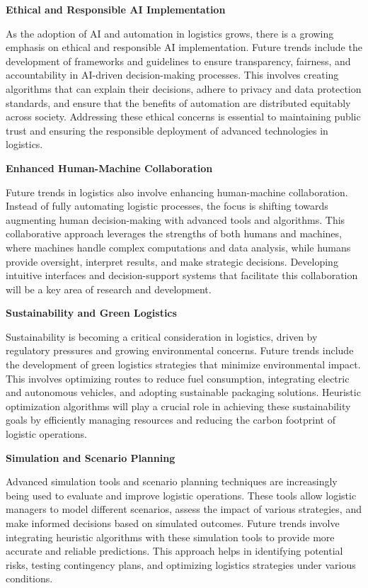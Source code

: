 \documentclass{article}
\begin{document}
    \textbf{Ethical and Responsible AI Implementation}

    As the adoption of AI and automation in logistics grows, there is a growing emphasis on ethical and responsible AI implementation. Future trends include the development of frameworks and guidelines to ensure transparency, fairness, and accountability in AI-driven decision-making processes. This involves creating algorithms that can explain their decisions, adhere to privacy and data protection standards, and ensure that the benefits of automation are distributed equitably across society. Addressing these ethical concerns is essential to maintaining public trust and ensuring the responsible deployment of advanced technologies in logistics.

    \textbf{Enhanced Human-Machine Collaboration}

    Future trends in logistics also involve enhancing human-machine collaboration. Instead of fully automating logistic processes, the focus is shifting towards augmenting human decision-making with advanced tools and algorithms. This collaborative approach leverages the strengths of both humans and machines, where machines handle complex computations and data analysis, while humans provide oversight, interpret results, and make strategic decisions. Developing intuitive interfaces and decision-support systems that facilitate this collaboration will be a key area of research and development.

    \textbf{Sustainability and Green Logistics}

    Sustainability is becoming a critical consideration in logistics, driven by regulatory pressures and growing environmental concerns. Future trends include the development of green logistics strategies that minimize environmental impact. This involves optimizing routes to reduce fuel consumption, integrating electric and autonomous vehicles, and adopting sustainable packaging solutions. Heuristic optimization algorithms will play a crucial role in achieving these sustainability goals by efficiently managing resources and reducing the carbon footprint of logistic operations.

    \textbf{Simulation and Scenario Planning}

    Advanced simulation tools and scenario planning techniques are increasingly being used to evaluate and improve logistic operations. These tools allow logistic managers to model different scenarios, assess the impact of various strategies, and make informed decisions based on simulated outcomes. Future trends involve integrating heuristic algorithms with these simulation tools to provide more accurate and reliable predictions. This approach helps in identifying potential risks, testing contingency plans, and optimizing logistics strategies under various conditions.
\end{document}

